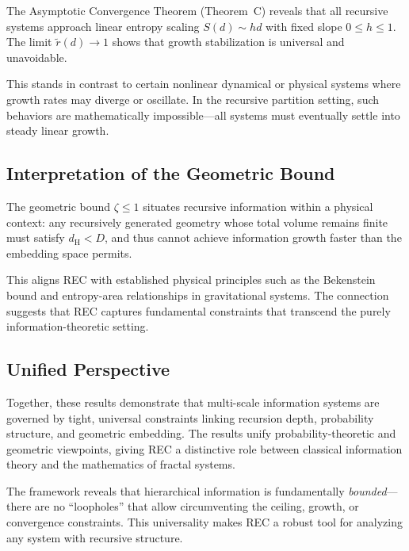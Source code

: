 \documentclass[11pt,a4paper]{article}
\theoremstyle{definition}
\theoremstyle{remark}
\newcommand{\dH}{d_{\mathrm{H}}}
\newcommand{\rtilde}{\tilde{r}}
\begin{document}
The Asymptotic Convergence Theorem (Theorem~C) reveals that all recursive
systems approach linear entropy scaling $S(d)\sim h d$ with fixed slope
$0 \le h \le 1$. The limit $\rtilde(d)\to1$ shows that growth stabilization
is universal and unavoidable. 

This stands in contrast to certain nonlinear 
dynamical or physical systems where growth rates may diverge or oscillate.
In the recursive partition setting, such behaviors are mathematically 
impossible---all systems must eventually settle into steady linear growth.

\subsection{Interpretation of the Geometric Bound}

The geometric bound $\zeta \le 1$ situates recursive information 
within a physical context: any recursively generated geometry whose total 
volume remains finite must satisfy $\dH < D$, and thus cannot achieve 
information growth faster than the embedding space permits. 

This aligns REC with established physical principles such as the Bekenstein 
bound and entropy-area relationships in gravitational systems. The connection
suggests that REC captures fundamental constraints that transcend the purely
information-theoretic setting.

\subsection{Unified Perspective}

Together, these results demonstrate that multi-scale information systems are 
governed by tight, universal constraints linking recursion depth, probability
structure, and geometric embedding. The results unify probability-theoretic 
and geometric viewpoints, giving REC a distinctive role between classical 
information theory and the mathematics of fractal systems.

The framework reveals that hierarchical information is fundamentally 
\emph{bounded}---there are no ``loopholes'' that allow circumventing
the ceiling, growth, or convergence constraints. This universality
makes REC a robust tool for analyzing any system with recursive structure.

\end{document}
